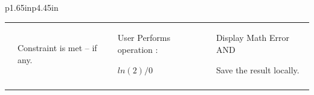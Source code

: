 \documentclass[12pt]{article}
\begin{document}
\begin{table}[H]
\begin{tabular}{p{1.65in}p{4.45in}}
{\begin{table}[H]
\begin{tabular}{p{1.36in}p{1.36in}p{1.36in}p{1.36in}}
\hhline{----}
\multicolumn{1}{|p{1.36in}}{T\_L-US9\_2} & 
\multicolumn{1}{|p{1.36in}}{Constraint is met – if any.} & 
\multicolumn{1}{|p{1.36in}}{User Performs operation :  \par $ln(2) / 0$} & 
\multicolumn{1}{|p{1.36in}|}{Display Math Error AND  \par Save the result locally.} \\
\hhline{----}

\end{tabular}
 \end{table}
\par } \\
\hhline{--}
 \\
\hhline{--}
 \\
\hhline{--}

\end{tabular}
 \end{table}
\end{document}

